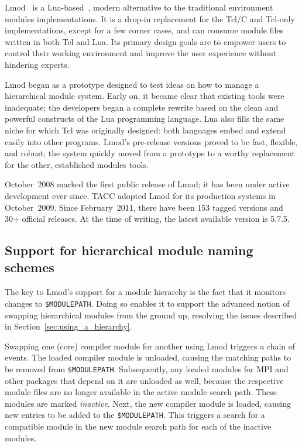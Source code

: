Lmod~\cite{laytonLmod,taccSecretSauce,taccLmod} is a Lua-based~\cite{LuaBook},
modern alternative to the traditional environment modules implementations.
It is a drop-in replacement for the Tcl/C
and Tcl-only implementations, except for a few corner cases, and
can consume module files written in both Tcl and
Lua. Its primary design goals are to empower users to control their
working environment and improve the user experience without hindering experts.

Lmod began as a prototype designed to test ideas on how to manage a hierarchical
module system.  Early on, it became clear that existing tools were inadequate; 
the developers began a complete rewrite based on the clean
and powerful constructs of the Lua programming language.
Lua also fills the same niche for which Tcl was
originally designed: both languages embed and extend easily into
other programs.  Lmod's pre-release versions proved to be
fast, flexible, and robust; the system quickly moved from
a prototype to a worthy replacement for the other, established modules tools.

October~2008 marked the first public release of Lmod; it has been under active
development ever since. TACC adopted Lmod for its production systems in October~2009.
Since February~2011, there have been 153 tagged versions and 30+ official releases.
At the time of writing, the latest available version is 5.7.5.

\subsection{Support for hierarchical module naming schemes}

The key to Lmod's support for a module hierarchy is the fact that it monitors
changes to \texttt{\small \$MODULEPATH}. Doing so enables it to support the
advanced notion of swapping hierarchical modules from the ground up, resolving
the issues described in Section~\ref{sec:using_a_hierarchy}.

Swapping one (core) compiler module for another using Lmod triggers
a chain of events. The loaded compiler module is unloaded, 
causing the matching paths to be removed from \texttt{\small \$MODULEPATH}.
Subsequently, any loaded modules for MPI and other packages that depend on it
are unloaded as well, because the respective module files are no longer available
in the active module search path. These modules are marked \emph{inactive}.
Next, the new compiler module is loaded, causing new entries
to be added to the \texttt{\small \$MODULEPATH}. This triggers a search
for a compatible module in the new module search path for each of the inactive modules.

